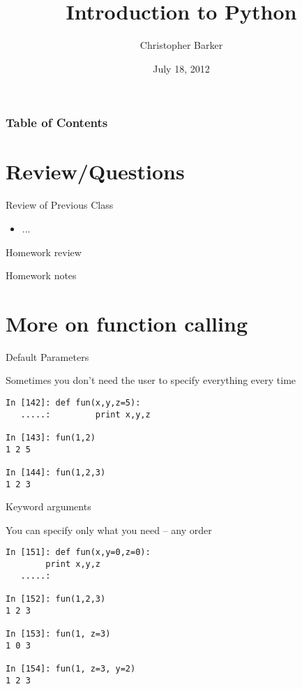 \documentclass{beamer}
\title[Intro to Python: Week 4]{Introduction  to Python}
\author{Christopher Barker}
\institute{UW Continuing Education / Isilon}
\date{July 18, 2012}
\begin{document}
\begin{frame}
  \titlepage
\end{frame}

\begin{frame}
\frametitle{Table of Contents}
  \tableofcontents
\end{frame}


\section{Review/Questions}

\begin{frame}{Review of Previous Class}

\begin{itemize}
  \item ...
\end{itemize}

\end{frame}


\begin{frame}{Homework review}

  {\Large Homework notes }

\end{frame}

\section{More on function calling}

\begin{frame}[fragile]{Default Parameters}

 {\Large Sometimes you don't need the user to specify everything every time}

\begin{verbatim}
In [142]: def fun(x,y,z=5):
   .....:         print x,y,z

In [143]: fun(1,2)
1 2 5

In [144]: fun(1,2,3)
1 2 3
\end{verbatim}

\end{frame} 

\begin{frame}[fragile]{Keyword arguments}

 {\Large You can specify only what you need -- any order}

\begin{verbatim}
In [151]: def fun(x,y=0,z=0):
        print x,y,z
   .....:     

In [152]: fun(1,2,3)
1 2 3

In [153]: fun(1, z=3)
1 0 3

In [154]: fun(1, z=3, y=2)
1 2 3
\end{verbatim}

\end{frame} 
\end{document}
